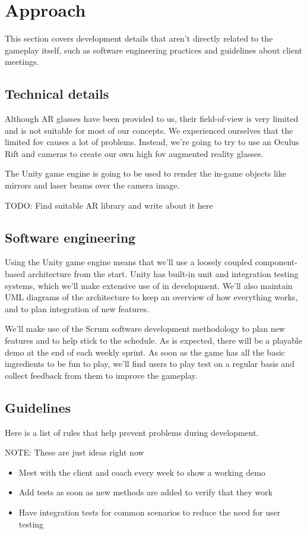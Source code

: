 \section{Approach}

This section covers development details that aren't directly related to the
gameplay itself, such as software engineering practices and guidelines about
client meetings.

\subsection{Technical details}

Although AR glasses have been provided to us, their field-of-view is very
limited and is not suitable for most of our concepts. We experienced ourselves
that the limited fov causes a lot of problems. Instead, we're going to try to
use an Oculus Rift and cameras to create our own high fov augmented reality
glasses.

The Unity game engine is going to be used to render the in-game objects like
mirrors and laser beams over the camera image.

{\color{red} TODO: Find suitable AR library and write about it here}

\subsection{Software engineering}

Using the Unity game engine means that we'll use a loosely coupled
component-based architecture from the start. Unity has built-in unit and
integration testing systems, which we'll make extensive use of in development.
We'll also maintain UML diagrams of the architecture to keep an overview of how
everything works, and to plan integration of new features.

We'll make use of the Scrum software development methodology to plan new
features and to help stick to the schedule. As is expected, there will be a
playable demo at the end of each weekly sprint. As soon as the game has all the
basic ingredients to be fun to play, we'll find users to play test on a regular
basis and collect feedback from them to improve the gameplay.

\subsection{Guidelines}

Here is a list of rules that help prevent problems during development.

{\color{red} NOTE: These are just ideas right now}

\begin{itemize}
	\item Meet with the client and coach every week to show a working demo
	\item Add tests as soon as new methods are added to verify that they work
	\item Have integration tests for common scenarios to reduce the need for user testing
\end{itemize}